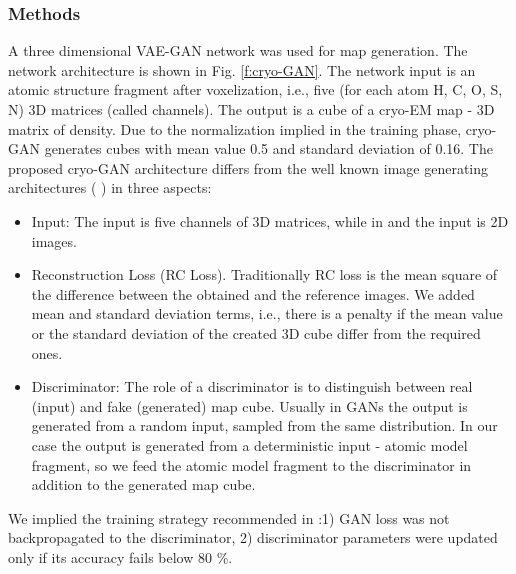 \subsubsection{Methods}
A three dimensional VAE-GAN network was used for map generation. The network architecture is shown in Fig. \ref{f:cryo-GAN}. 
The network input is an atomic structure fragment after voxelization, i.e., five (for each atom H, C, O, S, N) 3D matrices (called channels).
The output is a cube of a cryo-EM map - 3D matrix of density.
Due to the normalization implied in the training phase, cryo-GAN generates cubes with mean value 0.5 and standard deviation of 0.16.
The proposed  cryo-GAN architecture differs from the well known image generating  architectures ( \cite{Larsen2016,Wu}) in three aspects:
\begin{itemize}
    \item Input: The input is five channels of 3D matrices, while in \cite{Larsen2016} and \cite{Wu} the input is 2D images.
    \item Reconstruction Loss (RC Loss).
    Traditionally RC loss is the mean square of the difference between the obtained and the reference images.
    We  added mean and standard deviation  terms, i.e., there is a penalty if the mean value or the standard deviation of the created 3D cube differ from the required ones.
    \item Discriminator: The role of a discriminator is to distinguish between real (input) and  fake (generated) map cube. 
    Usually in GANs the output is generated from a random input, sampled from the same distribution. 
    In our case the output is generated from a deterministic input - atomic model fragment,  so we feed the  atomic model fragment to the discriminator in addition to the generated map cube.
\end{itemize}
We implied the training strategy recommended in \cite{Wu}:1) GAN loss  was not backpropagated to the discriminator, 2) discriminator parameters were updated only if its accuracy fails below 80 \%.



